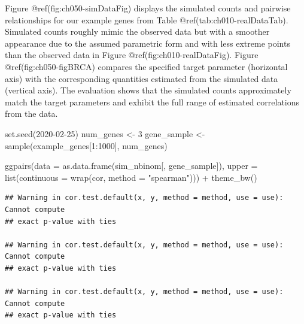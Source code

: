 \documentclass{article}
\newenvironment{Shaded}{\begin{snugshade}}{\end{snugshade}}
\newcommand{\AttributeTok}[1]{\textcolor[rgb]{0.77,0.63,0.00}{#1}}
\newcommand{\DecValTok}[1]{\textcolor[rgb]{0.00,0.00,0.81}{#1}}
\newcommand{\FunctionTok}[1]{\textcolor[rgb]{0.00,0.00,0.00}{#1}}
\newcommand{\NormalTok}[1]{#1}
\newcommand{\OtherTok}[1]{\textcolor[rgb]{0.56,0.35,0.01}{#1}}
\newcommand{\SpecialCharTok}[1]{\textcolor[rgb]{0.00,0.00,0.00}{#1}}
\newcommand{\StringTok}[1]{\textcolor[rgb]{0.31,0.60,0.02}{#1}}
\begin{document}
\begin{Shaded}
\end{Shaded}

Figure @ref(fig:ch050-simDataFig) displays the simulated counts and
pairwise relationships for our example genes from Table
@ref(tab:ch010-realDataTab). Simulated counts roughly mimic the observed
data but with a smoother appearance due to the assumed parametric form
and with less extreme points than the observed data in Figure
@ref(fig:ch010-realDataFig). Figure @ref(fig:ch050-figBRCA) compares the
specified target parameter (horizontal axis) with the corresponding
quantities estimated from the simulated data (vertical axis). The
evaluation shows that the simulated counts approximately match the
target parameters and exhibit the full range of estimated correlations
from the data.

\begin{Shaded}
\begin{Highlighting}[]
\FunctionTok{set.seed}\NormalTok{(}\DecValTok{2020{-}02{-}25}\NormalTok{)}
\NormalTok{num\_genes }\OtherTok{\textless{}{-}} \DecValTok{3}
\NormalTok{gene\_sample }\OtherTok{\textless{}{-}} \FunctionTok{sample}\NormalTok{(example\_genes[}\DecValTok{1}\SpecialCharTok{:}\DecValTok{1000}\NormalTok{], num\_genes)}

\FunctionTok{ggpairs}\NormalTok{(}\AttributeTok{data =} \FunctionTok{as.data.frame}\NormalTok{(sim\_nbinom[, gene\_sample]),}
        \AttributeTok{upper =} \FunctionTok{list}\NormalTok{(}\AttributeTok{continuous =} \FunctionTok{wrap}\NormalTok{(}\StringTok{\textquotesingle{}cor\textquotesingle{}}\NormalTok{, }\AttributeTok{method =} \StringTok{"spearman"}\NormalTok{))) }\SpecialCharTok{+} 
  \FunctionTok{theme\_bw}\NormalTok{()}
\end{Highlighting}
\end{Shaded}

\begin{verbatim}
## Warning in cor.test.default(x, y, method = method, use = use): Cannot compute
## exact p-value with ties

## Warning in cor.test.default(x, y, method = method, use = use): Cannot compute
## exact p-value with ties

## Warning in cor.test.default(x, y, method = method, use = use): Cannot compute
## exact p-value with ties
\end{verbatim}
\end{document}
